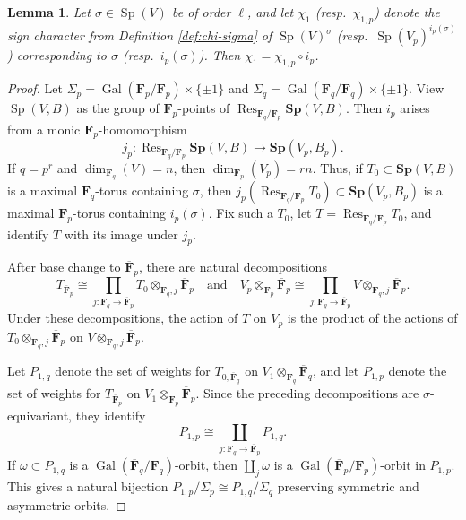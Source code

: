 \documentclass[reqno]{amsart}
\numberwithin{equation}{subsection}
\newcommand{\F}{\mathbf{F}}
\newcommand{\Gal}{\operatorname{Gal}}
\newcommand{\ol}[1]{\overline{#1}}
\newcommand{\co}{\colon}
\DeclareMathOperator{\Sp}{Sp}
\DeclareMathOperator{\Res}{Res}
\newtheorem{lemma}[thm]{Lemma}
\theoremstyle{remark}
\numberwithin{equation}{subsection}
\numberwithin{figure}{subsection}
\begin{document}
\begin{lemma}\label{lemma:sign-char-weil-restriction}
Let $\sigma \in \Sp(V)$ be of order $\ell$, and let $\chi_1$ (resp.\ $\chi_{1,p}$) denote the sign character from Definition \ref{def:chi-sigma} of $\Sp(V)^\sigma$ (resp.\ $\Sp(V_p)^{i_p(\sigma)}$) corresponding to $\sigma$ (resp.\ $i_p(\sigma)$). Then $\chi_1 = \chi_{1,p} \circ i_p$.
\end{lemma}

\begin{proof}
Let $\Sigma_p = \Gal(\ol\F_p/\F_p) \times \{\pm 1\}$ and $\Sigma_q = \Gal(\ol\F_q/\F_q) \times \{\pm1\}$. View $\Sp(V,B)$ as the group of $\F_p$-points of $\Res_{\F_q/\F_p}\mathbf{Sp}(V, B)$. Then $i_p$ arises from a monic $\F_p$-homomorphism
\[
j_p\co\Res_{\F_q/\F_p}\mathbf{Sp}(V, B) \to \mathbf{Sp}(V_p,B_p).
\]
If $q = p^r$ and $\dim_{\F_q}(V) = n$, then $\dim_{\F_p}(V_p) = rn$. Thus, if $T_0 \subset \mathbf{Sp}(V,B)$ is a maximal $\F_q$-torus containing $\sigma$, then $j_p(\Res_{\F_q/\F_p}T_0) \subset \mathbf{Sp}(V_p,B_p)$ is a maximal $\F_p$-torus containing $i_p(\sigma)$. Fix such a $T_0$, let $T = \Res_{\F_q/\F_p} T_0$, and identify $T$ with its image under $j_p$.

After base change to $\ol\F_p$, there are natural decompositions
\[
T_{\ol\F_p} \cong \prod_{j\co \F_q \to \ol\F_p} T_0 \otimes_{\F_q, j} \ol\F_p
\quad \text{and} \quad
V_p \otimes_{\F_p} \ol\F_p \cong \prod_{j\co \F_q \to \ol\F_p} V \otimes_{\F_q, j} \ol\F_p.
\]
Under these decompositions, the action of $T$ on $V_p$ is the product of the actions of $T_0 \otimes_{\F_q,j} \ol\F_p$ on $V \otimes_{\F_q,j} \ol\F_p$.

Let $P_{1,q}$ denote the set of weights for $T_{0,\ol\F_q}$ on $V_1 \otimes_{\F_q} \ol\F_q$, and let $P_{1,p}$ denote the set of weights for $T_{\ol\F_p}$ on $V_1 \otimes_{\F_p} \ol\F_p$. Since the preceding decompositions are $\sigma$-equivariant, they identify
\[
P_{1,p} \cong \coprod_{j\co \F_q \to \ol\F_p} P_{1,q}.
\]
If $\omega \subset P_{1,q}$ is a $\Gal(\ol\F_q/\F_q)$-orbit, then $\coprod_j \omega$ is a $\Gal(\ol\F_p/\F_p)$-orbit in $P_{1,p}$. This gives a natural bijection $P_{1,p}/\Sigma_p \cong P_{1,q}/\Sigma_q$ preserving symmetric and asymmetric orbits.


\end{proof}
\end{document}
